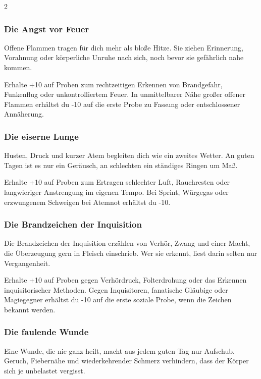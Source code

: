 {\begin{multicols*}{2}
        \subsubsection*{Die Angst vor Feuer}
        Offene Flammen tragen für dich mehr als bloße Hitze. Sie ziehen Erinnerung, Vorahnung oder körperliche Unruhe nach sich, noch bevor sie gefährlich nahe kommen.

        \malspielwertebox
        {Erhalte +10 auf Proben zum rechtzeitigen Erkennen von Brandgefahr, Funkenflug oder unkontrolliertem Feuer.}
        {In unmittelbarer Nähe großer offener Flammen erhältst du -10 auf die erste Probe zu Fassung oder entschlossener Annäherung.}

        \subsubsection*{Die eiserne Lunge}
        Husten, Druck und kurzer Atem begleiten dich wie ein zweites Wetter. An guten Tagen ist es nur ein Geräusch, an schlechten ein ständiges Ringen um Maß.

        \malspielwertebox
        {Erhalte +10 auf Proben zum Ertragen schlechter Luft, Rauchresten oder langwieriger Anstrengung im eigenen Tempo.}
        {Bei Sprint, Würgegas oder erzwungenem Schweigen bei Atemnot erhältst du -10.}

        \subsubsection*{Die Brandzeichen der Inquisition}
        Die Brandzeichen der Inquisition erzählen von Verhör, Zwang und einer Macht, die Überzeugung gern in Fleisch einschrieb. Wer sie erkennt, liest darin selten nur Vergangenheit.

        \malspielwertebox
        {Erhalte +10 auf Proben gegen Verhördruck, Folterdrohung oder das Erkennen inquisitorischer Methoden.}
        {Gegen Inquisitoren, fanatische Gläubige oder Magiegegner erhältst du -10 auf die erste soziale Probe, wenn die Zeichen bekannt werden.}

        \subsubsection*{Die faulende Wunde}
        Eine Wunde, die nie ganz heilt, macht aus jedem guten Tag nur Aufschub. Geruch, Fiebernähe und wiederkehrender Schmerz verhindern, dass der Körper sich je unbelastet vergisst.


\end{multicols*}}
